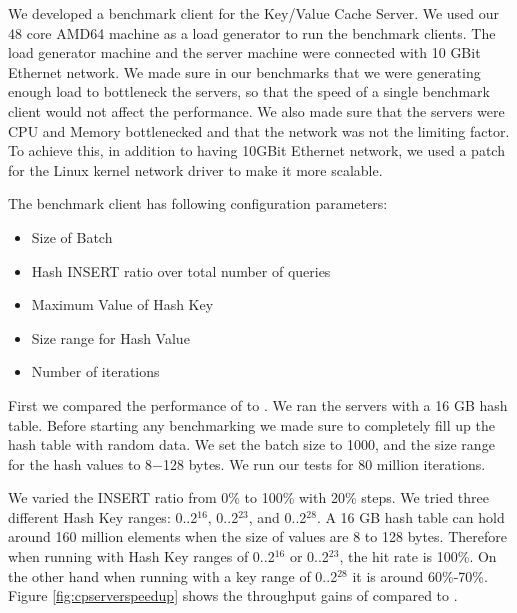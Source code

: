 We developed a benchmark client for the Key/Value Cache Server. We used our 48 core AMD64 machine as a load generator to run the benchmark clients. 
The load generator machine and the server machine were connected with 10 GBit Ethernet network. We made sure in our benchmarks that we were generating enough load to 
bottleneck the servers, so that the speed of a single benchmark client would not affect the performance. We also made sure that the servers were CPU and Memory 
bottlenecked and that the network was not the limiting factor. To achieve this, in addition to having 10GBit Ethernet network, we used a 
patch for the Linux kernel network driver \cite{mosbench} to make it more scalable.

The benchmark client has following configuration parameters:
\begin{itemize}
\item Size of Batch
\item Hash INSERT ratio over total number of queries
\item Maximum Value of Hash Key
\item Size range for Hash Value
\item Number of iterations
\end{itemize}

First we compared the performance of \cpserver{} to \lockserver{}. We ran the servers with a 16 GB hash table. Before starting any benchmarking we 
made sure to completely fill up the hash table with random data. We set the batch size to 1000, and the size range for the hash values to 8$-$128 bytes. We run our tests 
for 80 million iterations.

We varied the INSERT ratio from 0\% to 100\% with 20\% steps. We tried three different Hash Key ranges: 0..2$^{16}$, 0..2$^{23}$, and 0..2$^{28}$. A 16 GB hash table
can hold around 160 million elements when the size of values are 8 to 128 bytes. Therefore when running with Hash Key ranges of 0..2$^{16}$ or 0..2$^{23}$, the hit rate 
is 100\%. On the other hand when running with a key range of 0..2$^{28}$ it is around 60\%-70\%. Figure \ref{fig:cpserverspeedup} shows the throughput gains of 
\cpserver{} compared to \lockserver{}.

